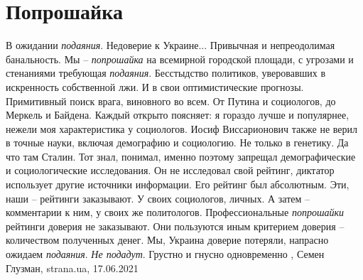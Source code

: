  
 
 
 
 
\chapter{Попрошайка}

В ожидании \emph{подаяния}.  Недоверие к Украине... Привычная и непреодолимая
банальность. Мы – \emph{попрошайка} на всемирной городской площади, с угрозами
и стенаниями требующая \emph{подаяния}.  Бесстыдство политиков, уверовавших в
искренность собственной лжи. И в свои оптимистические прогнозы.  Примитивный
поиск врага, виновного во всем. От Путина и социологов, до Меркель и Байдена.
Каждый открыто поясняет: я гораздо лучше и популярнее, нежели моя
характеристика у социологов. Иосиф Виссарионович также не верил в точные науки,
включая демографию и социологию. Не только в генетику.  Да что там Сталин. Тот
знал, понимал, именно поэтому запрещал демографические и социологические
исследования. Он не исследовал свой рейтинг, диктатор использует другие
источники информации. Его рейтинг был абсолютным. Эти, наши – рейтинги
заказывают. У своих социологов, личных. А затем – комментарии к ним, у своих же
политологов.  Профессиональные \emph{попрошайки} рейтинги доверия не
заказывают. Они пользуются иным критерием доверия – количеством полученных
денег. Мы, Украина доверие потеряли, напрасно ожидаем \emph{подаяния}. \emph{Не
подадут}.  Грустно и гнусно одновременно
, 
Семен Глузман, strana.ua, 17.06.2021

